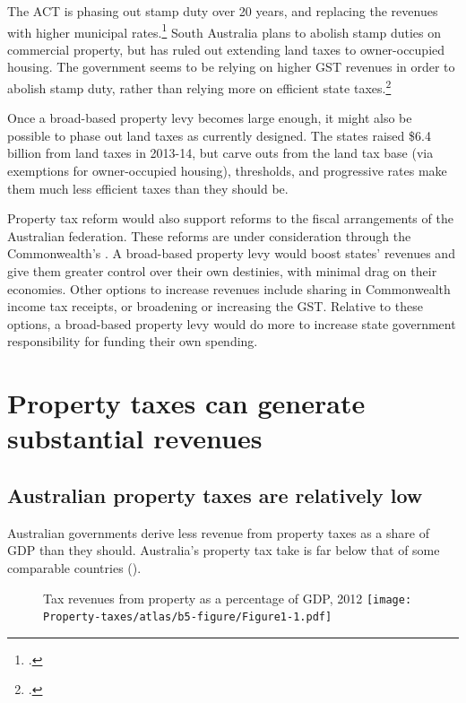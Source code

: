 \documentclass[twoside,english]{grattanBudgetRepairb5portrait}
\begin{document}
The ACT is phasing out stamp duty over 20 years, and replacing the revenues with higher municipal rates.\footcites[][21]{ACT-Treasury2012-13-Budget-Papers}[][229]{ACT-Treasury2014-15-Budget-Papers}  South Australia plans to abolish stamp duties on commercial property, but has ruled out extending land taxes to owner-occupied housing. The government seems to be relying on higher GST revenues in order to abolish stamp duty, rather than relying more on efficient state taxes.\footcites{GovernmentSouthAustralia2015-Govt-response-to-State-Tax-Review}{DTF2015-State-Budget-Papers-201516} 

Once a broad-based property levy becomes large enough, it might also be possible to phase out land taxes as currently designed. The states raised \$6.4 billion from land taxes in 2013-14, but carve outs from the land tax base (via exemptions for owner-occupied housing), thresholds, and progressive rates make them much less efficient taxes than they should be. 

Property tax reform would also support reforms to the fiscal arrangements of the Australian federation. These reforms are under consideration through the Commonwealth’s 
.
A broad-based property levy would boost states’ revenues and give them greater control over their own destinies, with minimal drag on their economies. Other options to increase revenues include sharing in Commonwealth income tax receipts, or broadening or increasing the GST\@. Relative to these options, a broad-based property levy would do more to increase state government responsibility for funding their own spending. 


\chapter{Property taxes can generate substantial revenues}\label{chapter:PROP-3}
\section{Australian property taxes are relatively low}
Australian governments derive less revenue from property taxes as a share of GDP than they should. Australia’s property tax take is far below that of some comparable countries ().

\begin{figure}
%
{Tax revenues from property as a percentage of GDP, 2012}
\texttt{[image: Property-taxes/atlas/b5-figure/Figure1-1.pdf]}

\end{figure}
\end{document}

